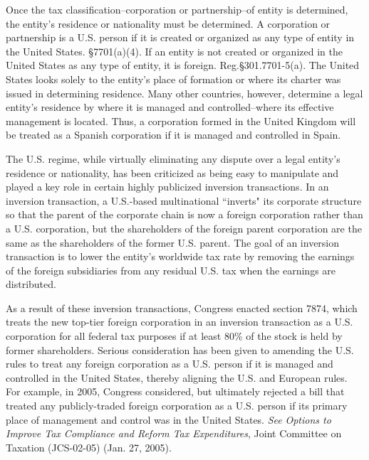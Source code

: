 Once the tax classification--corporation or partnership--of entity is determined, the entity's residence or nationality must be determined.  A corporation or partnership is a U.S. person if it is created or organized as any type of entity in the United States.  \S7701(a)(4).   If an entity is not created or organized in the United States as any type of entity, it is foreign.  Reg.\@ \S301.7701-5(a).  The United States looks solely to the entity's  place of formation or where its charter was issued in determining residence.  Many other countries, however, determine a legal entity's residence by where it is managed and controlled--where its effective management is located.  Thus, a corporation formed in the United Kingdom will be treated as a Spanish corporation if it is managed and controlled in Spain.  

The U.S. regime, while virtually eliminating any dispute over a legal entity's residence or nationality, has been criticized as being easy to manipulate and played a key role in certain highly publicized inversion transactions.  In an inversion transaction, a U.S.-based multinational ``inverts" its corporate structure so that the parent of the corporate chain is now a foreign corporation rather than a U.S. corporation, but the shareholders of the foreign parent corporation are the same as the shareholders of the former U.S. parent.  The goal of an inversion transaction is to lower the entity's worldwide tax rate by removing the earnings of the foreign subsidiaries from any residual U.S. tax when the earnings are distributed.     

As a result of these inversion transactions, Congress enacted section 7874, which treats the new top-tier foreign corporation in an inversion transaction as a U.S. corporation for all federal tax purposes if at least 80\% of the stock is held by former shareholders.  Serious consideration has been given to amending the U.S. rules to treat any foreign corporation as a U.S. person if it is managed and controlled in the United States, thereby aligning the U.S. and European rules.  For example, in 2005, Congress considered, but ultimately rejected a bill that treated any publicly-traded foreign corporation as a U.S. person if its primary place of management and control was in the United States.  \emph{See} \emph{Options to Improve Tax Compliance and Reform Tax Expenditures}, Joint Committee on Taxation (JCS-02-05) (Jan. 27, 2005).



